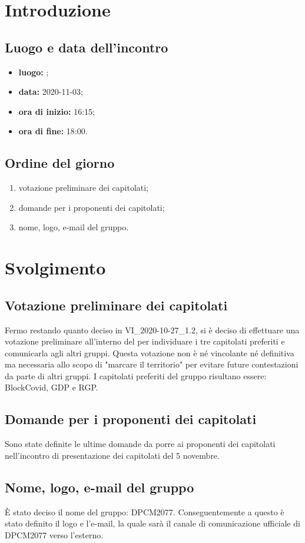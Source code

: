 \section*{Introduzione}
\subsection*{Luogo e data dell'incontro}
\begin{itemize}
	\item \textbf{luogo:} ;
	\item \textbf{data:} 2020-11-03;
	\item \textbf{ora di inizio:} 16:15;
	\item \textbf{ora di fine:} 18:00.
\end{itemize}

\subsection*{Ordine del giorno}
\begin{enumerate}
	\item votazione preliminare dei capitolati;
	\item domande per i proponenti dei capitolati;
	\item nome, logo, e-mail del gruppo.
\end{enumerate}

\section*{Svolgimento}
\subsection*{Votazione preliminare dei capitolati}
Fermo restando quanto deciso in VI\_2020-10-27\_1.2, si è deciso di effettuare una votazione preliminare all'interno del  per individuare i tre capitolati preferiti e comunicarla agli altri gruppi. Questa votazione non è né vincolante né definitiva ma necessaria allo scopo di "marcare il territorio" per evitare future contestazioni da parte di altri gruppi. I capitolati preferiti del gruppo risultano essere: BlockCovid, GDP e RGP.
\subsection*{Domande per i proponenti dei capitolati}
Sono state definite le ultime domande da porre ai proponenti dei capitolati nell'incontro di presentazione dei capitolati del 5 novembre.
\subsection*{Nome, logo, e-mail del gruppo}
È stato deciso il nome del gruppo: DPCM2077. Conseguentemente a questo è stato definito il logo e l'e-mail, la quale sarà il canale di comunicazione ufficiale di DPCM2077 verso l'esterno.
